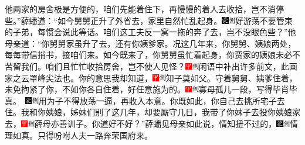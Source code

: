 他两家的房舍极是方便的，咱们先能着住下，再慢慢的着人去收拾，岂不消停些。”薛蟠道：“如今舅舅正升了外省去，家里自然忙乱起身。{\includegraphics[width=3mm]{../Images/00006}\includegraphics[width=3mm]{../Images/00011}\footnotesize \kaishu 好游荡不要管束的子弟，每惯会说此等话。}咱们这工夫反一窝一拖的奔了去，岂不没眼色些？”他母亲道：“你舅舅家虽升了去，还有你姨爹家。况这几年来，你舅舅、姨娘两处，每每带信捎书，接咱们来。如今既来了，你舅舅虽忙着起身，你贾家的姨娘未必不苦留我们。咱们且忙忙收拾房舍，岂不使人见怪？{\includegraphics[width=3mm]{../Images/00002}\includegraphics[width=3mm]{../Images/00011}\footnotesize \kaishu 闲语中补出许多前文，此画家之云罩峰尖法也。}你的意思我却知道，{\includegraphics[width=3mm]{../Images/00002}\includegraphics[width=3mm]{../Images/00011}\footnotesize \kaishu 知子莫如父。}守着舅舅、姨爹住着，未免拘紧了你，不如你各自住着，好任意施为的。{{\includegraphics[width=3mm]{../Images/00002}\includegraphics[width=3mm]{../Images/00011}\footnotesize \kaishu 寡母孤儿一段，写得毕肖毕真。　}\includegraphics[width=3mm]{../Images/00006}\includegraphics[width=3mm]{../Images/00011}\footnotesize \kaishu 用为子不得放荡一逼，再收入本意。}你既如此，你自己去挑所宅子去住。我和你姨娘，姊妹们别了这几年，却要厮守几日，我带了你妹子去投你姨娘家去，{\includegraphics[width=3mm]{../Images/00002}\includegraphics[width=3mm]{../Images/00011}\footnotesize \kaishu 薛母亦善训子。}你道好不好？”薛蟠见母亲如此说，情知扭不过的，{\includegraphics[width=3mm]{../Images/00006}\includegraphics[width=3mm]{../Images/00011}\footnotesize \kaishu 情理如真。}只得吩咐人夫一路奔荣国府来。

